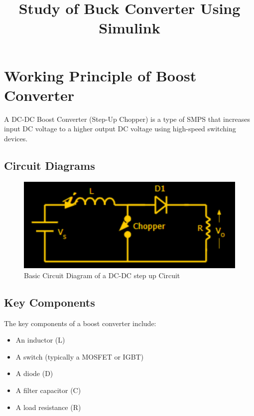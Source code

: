 \documentclass[12pt]{article}
\title{Study of Buck Converter Using Simulink}
\author{}
\date{}
\begin{document}


\pagebreak

\tableofcontents

\pagebreak
{}
\maketitle

\section*{Working Principle of Boost Converter}
A DC-DC Boost Converter (Step-Up Chopper) is a type of SMPS that increases input DC voltage to a higher output DC voltage using high-speed switching devices.

\subsection*{Circuit Diagrams}
\begin{figure}[H]
    \centering
    \includegraphics[width=.5\textwidth]{ckt.png}
    \caption{Basic Circuit Diagram of a DC-DC step up Circuit}
\end{figure}

\subsection*{Key Components}
The key components of a boost converter include:
\begin{itemize}
    \item An inductor (L)
    \item A switch (typically a MOSFET or IGBT)
    \item A diode (D)
    \item A filter capacitor (C)
    \item A load resistance (R)
\end{itemize}
\end{document}
